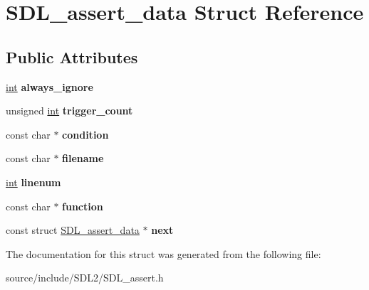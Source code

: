 \hypertarget{struct_s_d_l__assert__data}{}\section{S\+D\+L\+\_\+assert\+\_\+data Struct Reference}
\label{struct_s_d_l__assert__data}
\subsection*{Public Attributes}
\begin{DoxyCompactItemize}
\item 
\hypertarget{struct_s_d_l__assert__data_ac8997040e60dd538facd3604f0498dd4}{}\hyperlink{_s_d_l__thread_8h_a6a64f9be4433e4de6e2f2f548cf3c08e}{int} {\bfseries always\+\_\+ignore}\label{struct_s_d_l__assert__data_ac8997040e60dd538facd3604f0498dd4}

\item 
\hypertarget{struct_s_d_l__assert__data_ac3e02d5e1ed06d11f7e49b6d652655d6}{}unsigned \hyperlink{_s_d_l__thread_8h_a6a64f9be4433e4de6e2f2f548cf3c08e}{int} {\bfseries trigger\+\_\+count}\label{struct_s_d_l__assert__data_ac3e02d5e1ed06d11f7e49b6d652655d6}

\item 
\hypertarget{struct_s_d_l__assert__data_aa2e21779fd9c5fd035c6deabe8aa4325}{}const char $\ast$ {\bfseries condition}\label{struct_s_d_l__assert__data_aa2e21779fd9c5fd035c6deabe8aa4325}

\item 
\hypertarget{struct_s_d_l__assert__data_ac4ae13a8034710658976e462a508ed39}{}const char $\ast$ {\bfseries filename}\label{struct_s_d_l__assert__data_ac4ae13a8034710658976e462a508ed39}

\item 
\hypertarget{struct_s_d_l__assert__data_aec495b21ff71db1226eff0e6d5db333a}{}\hyperlink{_s_d_l__thread_8h_a6a64f9be4433e4de6e2f2f548cf3c08e}{int} {\bfseries linenum}\label{struct_s_d_l__assert__data_aec495b21ff71db1226eff0e6d5db333a}

\item 
\hypertarget{struct_s_d_l__assert__data_a437899d4b1faaab73d14096374a5a18b}{}const char $\ast$ {\bfseries function}\label{struct_s_d_l__assert__data_a437899d4b1faaab73d14096374a5a18b}

\item 
\hypertarget{struct_s_d_l__assert__data_a8737ef791c8f3f1f4db4c8f627543936}{}const struct \hyperlink{struct_s_d_l__assert__data}{S\+D\+L\+\_\+assert\+\_\+data} $\ast$ {\bfseries next}\label{struct_s_d_l__assert__data_a8737ef791c8f3f1f4db4c8f627543936}

\end{DoxyCompactItemize}


The documentation for this struct was generated from the following file\+:\begin{DoxyCompactItemize}
\item 
source/include/\+S\+D\+L2/S\+D\+L\+\_\+assert.\+h\end{DoxyCompactItemize}
